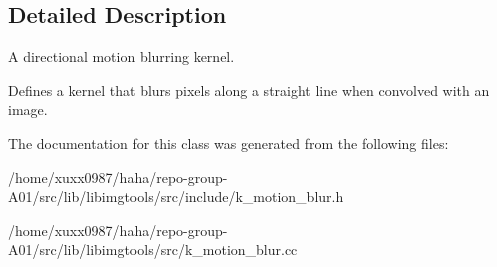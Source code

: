 \subsection{Detailed Description}
A directional motion blurring kernel. 

Defines a kernel that blurs pixels along a straight line when convolved with an image. 

The documentation for this class was generated from the following files\+:\begin{DoxyCompactItemize}
\item 
/home/xuxx0987/haha/repo-\/group-\/\+A01/src/lib/libimgtools/src/include/k\+\_\+motion\+\_\+blur.\+h\item 
/home/xuxx0987/haha/repo-\/group-\/\+A01/src/lib/libimgtools/src/k\+\_\+motion\+\_\+blur.\+cc\end{DoxyCompactItemize}
